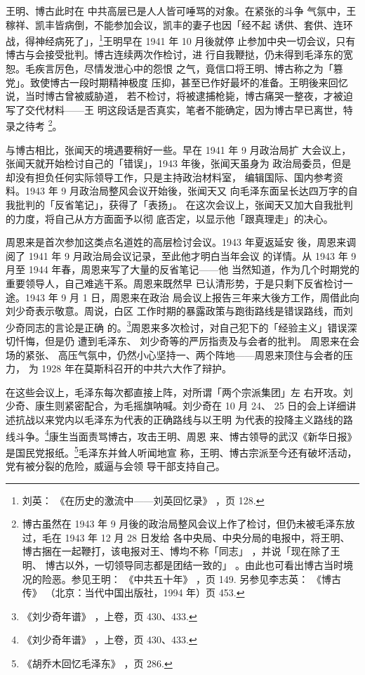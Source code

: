王明、博古此时在
中共高层已是人人皆可唾骂的对象。在紧张的斗争
气氛中，王稼祥、凯丰皆病倒，不能参加会议，凯丰的妻子也因「经不起
诱供、套供、连环战，得神经病死了」，\footnote{刘英：
《在历史的激流中——刘英回忆录》
，页 128.}王明早在 1941 年 10 月後就停
止参加中央一切会议，只有博古与会接受批判。博古连续两次作检讨，进
行自我鞭挞，仍未得到毛泽东的宽恕。毛疾言厉色，尽情发泄心中的怨恨
之气，竟信口将王明、博古称之为「篡党」。致使博古一段时期精神极度
压抑，甚至已作好最坏的准备。王明後来回忆说，当时博古曾被威胁道，
若不检讨，将被逮捕枪毙，博古痛哭一整夜，才被迫写了交代材料——王
明这段话是否真实，笔者不能确定，因为博古早已离世，特录之待考
\footnote{博古虽然在 1943 年 9 月後的政治局整风会议上作了检讨，但仍未被毛泽东放过，毛在 1943 年 12 月 28 日发给
各中央局、中央分局的电报中，将王明、博古捆在一起鞭打，该电报对王、博均不称「同志」
，并说「现在除了王明、
博古以外，一切领导同志都是团结一致的」
。由此也可看出博古当时境况的险恶。参见王明：
《中共五十年》
，页 149. 另参见李志英：
《博古传》
（北京：当代中国出版社，1994 年）页 453. }。

与博古相比，张闻天的境遇要稍好一些。早在 1941 年 9 月政治局扩
大会议上，张闻天就开始检讨自己的「错误」，1943 年後，张闻天虽身为
政治局委员，但是却没有担负任何实际领导工作，只是主持政治材料室，
编辑国际、国内参考资料。1943 年 9 月政治局整风会议开始後，张闻天又
向毛泽东面呈长达四万字的自我批判的「反省笔记」，获得了「表扬」。
在这次会议上，张闻天又加大自我批判的力度，将自己从方方面面予以彻
底否定，以显示他「跟真理走」的决心。

周恩来是首次参加这类点名道姓的高层检讨会议。1943 年夏返延安
後，周恩来调阅了 1941 年 9 月政治局会议记录，至此他才明白当年会议
的详情。从 1943 年 9 月至 1944 年春，周恩来写了大量的反省笔记——他
当然知道，作为几个时期党的重要领导人，自己难逃干系。周恩来既然早
已认清形势，于是只剩下反省检讨一途。1943 年 9 月 1 日，周恩来在政治
局会议上报告三年来大後方工作，周借此向刘少奇表示敬意。周说，白区
工作时期的暴露政策与跑街路线是错误路线，而刘少奇同志的言论是正确
的。\footnote{《刘少奇年谱》
，上卷，页 430、433.}周恩来多次检讨，对自己犯下的「经验主义」错误深切忏悔，但是仍
遭到毛泽东、
刘少奇等的严厉指责及与会者的批判。
周恩来在会场的紧张、
高压气氛中，仍然小心坚持一、两个阵地——周恩来顶住与会者的压力，
为 1928 年在莫斯科召开的中共六大作了辩护。

在这些会议上，毛泽东每次都直接上阵，对所谓「两个宗派集团」左
右开攻。刘少奇、康生则紧密配合，为毛摇旗呐喊。刘少奇在 10 月 24、
25 日的会上详细讲述抗战以来党内以毛泽东为代表的正确路线与以王明
为代表的投降主义路线的路线斗争。\footnote{《刘少奇年谱》
，上卷，页 430、433.}康生当面责骂博古，攻击王明、周恩
来、博古领导的武汉《新华日报》是国民党报纸。\footnote{《胡乔木回忆毛泽东》
，页 286.}毛泽东并耸人听闻地宣
称，王明、博古宗派至今还有破坏活动，党有被分裂的危险，威逼与会领
导干部支持自己。

